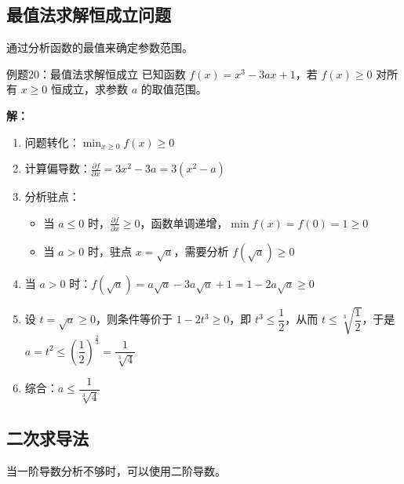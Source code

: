 \documentclass[a4paper,11pt]{ctexart}
\newcommand{\partialder}[2]{\frac{\partial #1}{\partial #2}}
\theoremstyle{definition}
\theoremstyle{remark}
\begin{document}
\subsection{最值法求解恒成立问题}

通过分析函数的最值来确定参数范围。

\begin{examplebox}{例题20：最值法求解恒成立}
已知函数 $f(x) = x^3 - 3ax + 1$，若 $f(x) \geq 0$ 对所有 $x \geq 0$ 恒成立，求参数 $a$ 的取值范围。

\textbf{解：}
\begin{enumerate}
    \item 问题转化：$\min_{x \geq 0} f(x) \geq 0$
    \item 计算偏导数：$\partialder{f}{x} = 3x^2 - 3a = 3(x^2 - a)$
    \item 分析驻点：
    \begin{itemize}
        \item 当 $a \leq 0$ 时，$\partialder{f}{x} \geq 0$，函数单调递增，$\min f(x) = f(0) = 1 \geq 0$
        \item 当 $a > 0$ 时，驻点 $x = \sqrt{a}$，需要分析 $f(\sqrt{a}) \geq 0$
    \end{itemize}
    \item 当 $a > 0$ 时：$f(\sqrt{a}) = a\sqrt{a} - 3a\sqrt{a} + 1 = 1 - 2a\sqrt{a} \geq 0$
    \item 设 $t = \sqrt{a} \geq 0$，则条件等价于 $1 - 2t^3 \geq 0$，即 $t^3 \leq \dfrac{1}{2}$，从而 $t \leq \sqrt[3]{\dfrac{1}{2}}$，于是 $a = t^2 \leq \left(\dfrac{1}{2}\right)^{\frac{2}{3}} = \dfrac{1}{\sqrt[3]{4}}$
    \item 综合：$a \leq \dfrac{1}{\sqrt[3]{4}}$
\end{enumerate}
\end{examplebox}

\subsection{二次求导法}

当一阶导数分析不够时，可以使用二阶导数。
\end{document}
